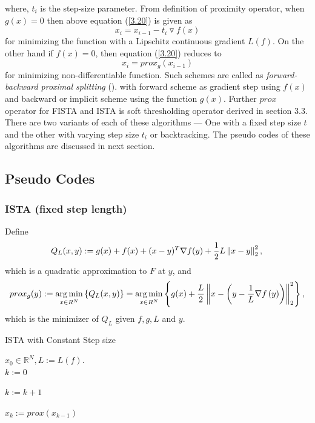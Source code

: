 where, $t_i$ is the step-size parameter. From definition of proximity operator, when $g(x)=0$
then above equation (\ref{3.20}) is given as
\begin{equation}
 x_i = x_{i-1}-t_i\triangledown f(x)
\label{3.21}
\end{equation}
for minimizing the function with a Lipschitz continuous gradient $L(f)$. On the other hand if
$f(x)=0$, then equation (\ref{3.20}) reduces to 
\begin{equation}
 x_i = prox_g(x_{i-1})
\end{equation}
for minimizing non-differentiable function. Such schemes are called as \emph{forward-backward proximal splitting} (\cite{Com07}).
with forward scheme as gradient step using $f(x)$ and backward or implicit scheme using the function $g(x)$. Further 
$prox$ operator for FISTA and ISTA is soft thresholding operator derived in section 3.3. There are two variants 
of each of these algorithms --- One with a fixed step size $t$ and the other with varying step size $t_i$ or backtracking.
The pseudo codes of these algorithms are discussed in next section.

\subsection{Pseudo Codes}
\label{s:algorithms_pseudo}
\subsubsection{ ISTA (fixed step length) }

Define
 \begin{equation}
  Q_L(x,y) := g(x) + f(x) + ( x - y )^T \nabla f(y) + {1 \over 2} L \left\lVert x-y \right\rVert_2^2, \\
 \end{equation}
 which is a quadratic approximation to $F$ at $y$,
 and
 \begin{equation}
  prox_g(y) := \operatorname*{arg\,min}_{x \in R^N} \left\{ Q_L(x,y) \right\} = \operatorname*{arg\,min}_{x \in R^N} \left\{ g(x) + {L \over 2} \left\lVert x - \left( y - {1 \over L} \nabla f\left(y\right) \right) \right\rVert_2^2 \right\},
 \end{equation}
 which is the minimizer of $Q_L$ given $f, g, L$ and $y$.
\vspace{10mm}
 \begin{algorithm}
  \caption{ISTA with Constant Step size} \label{ista_c}
  \begin{algorithmic}
   \Require $x_0 \in \mathbb{R}^N, L := L(f)$.\\
   $k := 0$
   \Repeat

    $k := k + 1$

    $x_{k} := prox( x_{k-1} )$

  \end{algorithmic}
 \end{algorithm}
\vspace{10mm}
